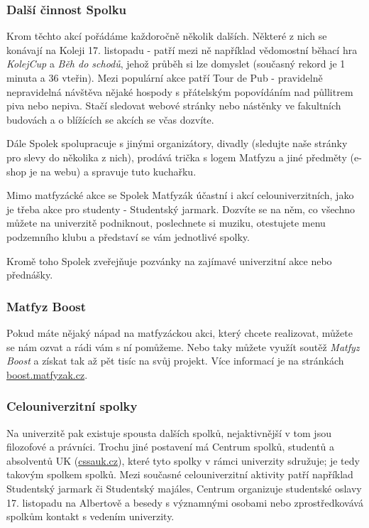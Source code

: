 \subsubsection{Další činnost Spolku}
Krom těchto akcí pořádáme každoročně několik dalších. Některé z nich se konávají
na Koleji 17. listopadu - patří mezi ně například vědomostní běhací hra
\textit{KolejCup} a \textit{Běh do schodů}, jehož průběh si lze domyslet
(současný rekord je 1 minuta a 36 vteřin). Mezi populární akce patří Tour de Pub
- pravidelně nepravidelná návštěva nějaké hospody s přátelským popovídáním nad
půllitrem piva nebo nepiva. Stačí sledovat webové stránky nebo nástěnky ve
fakultních budovách a o blížících se akcích se včas dozvíte.

Dále Spolek spolupracuje s jinými organizátory, divadly (sledujte naše stránky
pro slevy do několika z nich), prodává trička s logem Matfyzu a jiné předměty
(e-shop je na webu) a spravuje tuto kuchařku.

Mimo matfyzácké akce se Spolek Matfyzák účastní i akcí celouniverzitních, jako
je třeba akce pro studenty - Studentský jarmark. Dozvíte se na něm, co všechno
můžete na univerzitě podniknout, poslechnete si muziku, otestujete menu
podzemního klubu a představí se vám jednotlivé spolky.

Kromě toho Spolek zveřejňuje pozvánky na zajímavé univerzitní akce nebo
přednášky.


\subsubsection{Matfyz Boost}
Pokud máte nějaký nápad na matfyzáckou akci, který chcete realizovat, můžete se
nám ozvat a rádi vám s ní pomůžeme. Nebo taky můžete využít soutěž
\textit{Matfyz Boost} a získat tak až pět tisíc na svůj projekt. Více informací
je na stránkách \url{boost.matfyzak.cz}.


\subsubsection{Celouniverzitní spolky}
Na univerzitě pak existuje spousta dalších spolků, nejaktivnější v tom jsou
filozofové a právníci. Trochu jiné postavení má Centrum spolků, studentů a
absolventů UK (\url{cssauk.cz}), které tyto spolky v rámci univerzity sdružuje;
je tedy takovým spolkem spolků. Mezi současné celouniverzitní aktivity patří
například Studentský jarmark či Studentský majáles, Centrum organizuje
studentské oslavy 17. listopadu na Albertově a besedy s významnými osobami nebo
zprostředkovává spolkům kontakt s vedením univerzity.